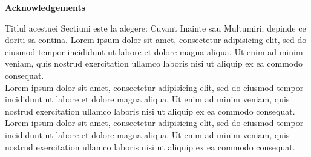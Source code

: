 \thispagestyle{plain} 


\vspace*{36pt}

\begin{center}

{\LARGE \textbf{Acknowledgements}}

\end{center}

\vspace{36pt}
Titlul acestuei Sectiuni este la alegere: Cuvant Inainte sau Multumiri; depinde ce doriti sa contina. Lorem ipsum dolor sit amet, consectetur adipisicing elit, sed do eiusmod tempor incididunt ut labore et dolore magna aliqua. Ut enim ad minim veniam, quis nostrud exercitation ullamco laboris nisi ut aliquip ex ea commodo consequat.\\

Lorem ipsum dolor sit amet, consectetur adipisicing elit, sed do eiusmod tempor incididunt ut labore et dolore magna aliqua. Ut enim ad minim veniam, quis nostrud exercitation ullamco laboris nisi ut aliquip ex ea commodo consequat.\\

Lorem ipsum dolor sit amet, consectetur adipisicing elit, sed do eiusmod tempor incididunt ut labore et dolore magna aliqua. Ut enim ad minim veniam, quis nostrud exercitation ullamco laboris nisi ut aliquip ex ea commodo consequat.\\

\vspace{40pt}



\vspace*{\fill}